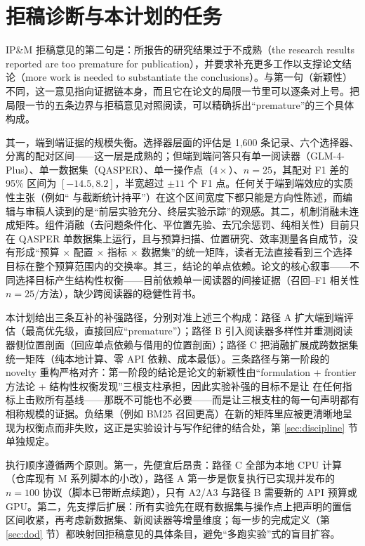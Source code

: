 \section{拒稿诊断与本计划的任务}

IP\&M 拒稿意见的第二句是：所报告的研究结果过于不成熟（the research results reported are too premature for publication），并要求补充更多工作以支撑论文结论（more work is needed to substantiate the conclusions）。与第一句（新颖性）不同，这一意见指向证据链本身，而且它在论文的局限一节里可以逐条对上号。把局限一节的五条边界与拒稿意见对照阅读，可以精确拆出``premature''的三个具体构成。

其一，端到端证据的规模失衡。选择器层面的评估是 1{,}600 条记录、六个选择器、分离的配对区间——这一层是成熟的；但端到端问答只有单一阅读器（GLM-4-Plus）、单一数据集（QASPER）、单一操作点（$4\times$）、$n{=}25$，其配对 F1 差的 95\% 区间为 $[-14.5, 8.2]$，半宽超过 $\pm 11$ 个 F1 点。任何关于端到端效应的实质性主张（例如``\sieve{} 与截断统计持平''）在这个区间宽度下都只能是方向性陈述，而编辑与审稿人读到的是``前层实验充分、终层实验示踪''的观感。其二，机制消融未连成矩阵。组件消融（去问题条件化、平位置先验、去冗余惩罚、纯相关性）目前只在 QASPER 单数据集上运行，且与预算扫描、位置研究、效率测量各自成节，没有形成``预算 $\times$ 配置 $\times$ 指标 $\times$ 数据集''的统一矩阵，读者无法直接看到三个选择目标在整个预算范围内的交换率。其三，结论的单点依赖。论文的核心叙事——不同选择目标产生结构性权衡——目前依赖单一阅读器的间接证据（召回--F1 相关性 $n{=}25$/方法），缺少跨阅读器的稳健性背书。

本计划给出三条互补的补强路径，分别对准上述三个构成：路径 A 扩大端到端评估（最高优先级，直接回应``premature''）；路径 B 引入阅读器多样性并重测阅读器侧位置剖面（回应单点依赖与借用的位置剖面）；路径 C 把消融扩展成跨数据集统一矩阵（纯本地计算、零 API 依赖、成本最低）。三条路径与第一阶段的 novelty 重构严格对齐：第一阶段的结论是论文的新颖性由``formulation + frontier 方法论 + 结构性权衡发现''三根支柱承担，因此实验补强的目标不是让 \sieve{} 在任何指标上击败所有基线——那既不可能也不必要——而是让三根支柱的每一句声明都有相称规模的证据。负结果（例如 BM25 召回更高）在新的矩阵里应被更清晰地呈现为权衡点而非失败，这正是实验设计与写作纪律的结合处，第 \ref{sec:discipline} 节单独规定。

执行顺序遵循两个原则。第一，先便宜后昂贵：路径 C 全部为本地 CPU 计算（仓库现有 M 系列脚本的小改），路径 A 第一步是恢复执行已实现并发布的 $n{=}100$ 协议（脚本已带断点续跑），只有 A2/A3 与路径 B 需要新的 API 预算或 GPU。第二，先支撑后扩展：所有实验先在既有数据集与操作点上把声明的置信区间收紧，再考虑新数据集、新阅读器等增量维度；每一步的完成定义（第 \ref{sec:dod} 节）都映射回拒稿意见的具体条目，避免``多跑实验''式的盲目扩容。
